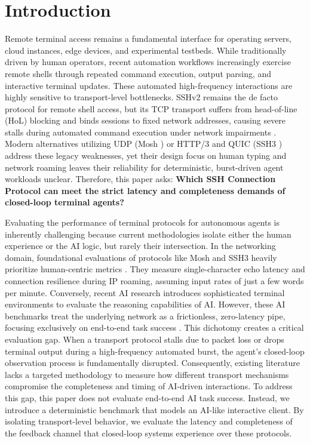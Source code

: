 \section{Introduction}
\label{sec:intro}
Remote terminal access remains a fundamental interface for operating servers, cloud instances, edge devices, and experimental testbeds. While traditionally driven by human operators, recent automation workflows increasingly exercise remote shells through repeated command execution, output parsing, and interactive terminal updates. These automated high-frequency interactions are highly sensitive to transport-level bottlenecks. SSHv2 remains the de facto protocol for remote shell access, but its TCP transport suffers from head-of-line (HoL) blocking and binds sessions to fixed network addresses, causing severe stalls during automated command execution under network impairments \cite{Scharf2007}. Modern alternatives utilizing UDP (Mosh \cite{Winstein2012}) or HTTP/3 and QUIC (SSH3 \cite{michel2023}) address these legacy weaknesses, yet their design focus on human typing and network roaming leaves their reliability for deterministic, burst-driven agent workloads unclear. Therefore, this paper asks: \textbf{Which SSH Connection Protocol can meet the strict latency and completeness demands of closed-loop terminal agents?}

Evaluating the performance of terminal protocols for autonomous agents is inherently challenging because current methodologies isolate either the human experience or the AI logic, but rarely their intersection. In the networking domain, foundational evaluations of protocols like Mosh and SSH3 heavily prioritize human-centric metrics \cite{michel2023}. They measure single-character echo latency and connection resilience during IP roaming, assuming input rates of just a few words per minute. Conversely, recent AI research introduces sophisticated terminal environments to evaluate the reasoning capabilities of AI. However, these AI benchmarks treat the underlying network as a frictionless, zero-latency pipe, focusing exclusively on end-to-end task success \cite{Liu2024}. This dichotomy creates a critical evaluation gap. When a transport protocol stalls due to packet loss or drops terminal output during a high-frequency automated burst, the agent’s closed-loop observation process is fundamentally disrupted. Consequently, existing literature lacks a targeted methodology to measure how different transport mechanisms compromise the completeness and timing of AI-driven interactions. To address this gap, this paper does not evaluate end-to-end AI task success. Instead, we introduce a deterministic benchmark that models an AI-like interactive client. By isolating transport-level behavior, we evaluate the latency and completeness of the feedback channel that closed-loop systems experience over these protocols. 

